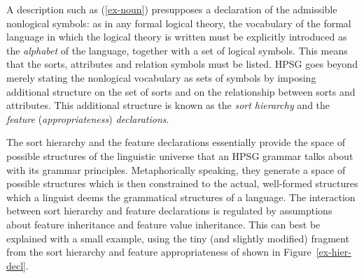 \documentclass[output=paper
 	        ,biblatex
                ,babelshorthands
                ,newtxmath
                ,draftmode
                ,colorlinks, citecolor=brown
]{langscibook}
\begin{document}
\ea
\label{ex-noun}
\z

A description such as (\ref{ex-noun}) presupposes a declaration of the
admissible nonlogical symbols: as in any formal logical theory, the
vocabulary of the formal language in which the logical theory is
written must be explicitly introduced as the \emph{alphabet} of the
language, together with a set of logical symbols. This means that the
sorts, attributes and relation symbols must be listed. HPSG
goes beyond merely stating the nonlogical vocabulary as sets of
symbols by imposing additional structure on the set of sorts and on
the relationship between sorts and attributes. This additional
structure is known as the \emph{sort hierarchy} and the \emph{feature}
  (\emph{appropriateness}) \emph{declarations}.

The sort hierarchy and the feature declarations essentially provide the
space of possible structures of the linguistic universe that an HPSG
grammar talks about with its grammar principles. Metaphorically
speaking, they generate a space of possible structures which is then
constrained to the actual, well-formed structures which a
linguist deems the grammatical structures of a language. The
interaction between sort hierarchy and feature declarations is
regulated by assumptions about feature inheritance and feature value
inheritance. This can best be explained with a small example, using
the tiny (and slightly modified) fragment from the sort hierarchy and
feature appropriateness of \cite{PollardSag1994} shown in
Figure~\ref{ex-hier-decl}.
\end{document}
